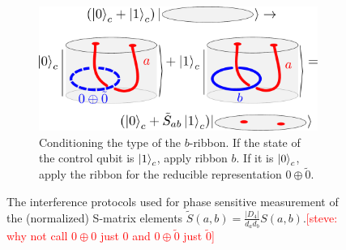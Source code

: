 \documentclass[two column]{article}
\newcommand{\caro}[1]{\textcolor{red}{[#1]}}
\begin{document}
\begin{figure}
\vspace{15pt}

\begin{subfigure}{0.47\textwidth}
    \includegraphics[width=\linewidth]{Figures/intefFlav.pdf}
    \caption{Conditioning the type of the $b$-ribbon. If the state of the control qubit is $\ket{1}_c$, apply ribbon $b$. If it is $\ket{0}_c$, apply the ribbon for the reducible representation $0\oplus\tilde{0}$.}
    \label{fig:cond_flav}
\end{subfigure}

\caption{The interference protocols used for phase sensitive measurement of the (normalized) S-matrix elements  $\tilde{S}(a,b) = \frac{|D_4|}{d_a d_b}S(a,b)$.\caro{steve: why not call $0\oplus 0$ just $0$ and $0 \oplus \tilde 0 $ just $\tilde 0$}}
\label{fig:S-mat}
\end{figure}
\end{document}
